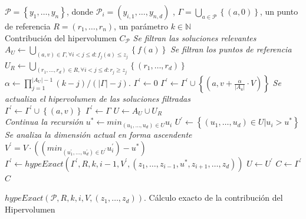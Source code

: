 \begin{algorithm}
\begin{algorithmic}[1]	
      \REQUIRE $\mathcal{P}=\left\{y_1,\ldots,y_n\right\}$, donde $\mathcal{P}_i = \left(y_{i,1},\ldots,y_{n,d}\right) $ , 
		$\varGamma = \bigcup_{a \in \mathcal{P}} \left\{ \left(a, 0 \right) \right\}$,
		un punto de referencia $R=\left(r_1,\ldots,r_n\right)$, un par\'ametro $k \in \mathds{N}$\\
      \ENSURE Contribuci\'on del hipervolumen $C_{\mathcal{P}}$
	\STATE \textit{Se filtran las soluciones relevantes} $A_U \leftarrow \bigcup_{\left(a,v\right)\in \varGamma, \forall i<j\leq d:f_{j}\left(a\right)\leq z_{j}}\left\{f\left(a\right)\right\} $ 
	\STATE \textit{Se filtran los puntos de referencia} $U_R \leftarrow \bigcup_{\left(r_1,\ldots,r_d\right)\in R, \forall i<j\leq d:r_{j}\geq z_{j}} \left\{\left(r_1,\ldots,r_d\right)\right\}$ 
		\STATE $\alpha \leftarrow \prod^{\left|A_{U}\right|-1}_{j=1} \left(k-j\right)/\left(\left|\varGamma\right| - j\right)$.			
		\STATE $\varGamma^{'} \leftarrow 0$
				\STATE $\varGamma^{'} \leftarrow \varGamma^{'} \cup \left\{\left(a,v + \frac{\alpha}{\left|A_{u}\right|}\cdot V\right)\right\}$
			\ELSE 
				\STATE \textit{Se actualiza el hipervolumen de las soluciones filtradas}\\
				$\varGamma^{'} \leftarrow \varGamma^{'} \cup \left\{\left(a,v\right)\right\}$
			\ENDIF
		\ENDFOR
	\ELSE {} 
		\STATE $\varGamma^{'} \leftarrow \varGamma$ 
		\STATE $U \leftarrow A_{U} \cup U_R$ \\
		\textit{Continua la recursi\'on}   
			\STATE $u^{*} \leftarrow min_{\left(u_1,\ldots,u_d\right)\in U} u_i$ 
			\STATE $U^{'}\leftarrow \left\{\left(u_1,\ldots,u_d\right)\in U | u_i > u^{*} \right\}$\\
			\textit{Se analiza la dimensi\'on actual en forma ascendente}
				\STATE $V^{'} = V \cdot \left( \left(min_{\left(u^{'}_1,\ldots,u^{'}_d\right)\in U^{'}} u^{'}_i\right)-u^{*}\right) $
				\STATE $\varGamma^{'} \leftarrow hypeExact \left(\varGamma^{'},R,k,i-1,V^{'},\left(z_{1},\ldots,z_{i-1},u^{*},z_{i+1},\ldots,z_{d}\right)\right)$
			\ENDIF 
			\STATE $U \leftarrow U^{'}$
		\ENDWHILE
		\ENDIF
	\ENDIF		
	\STATE $C \leftarrow \varGamma^{'} $
	\RETURN  $C$
  \end{algorithmic}
\caption[$hypeExact$]{$hypeExact \left(\mathcal{P},R,k,i,V,\left(z_{1},\ldots,z_{d}\right)\right)$. C\'alculo exacto de la contribuci\'on del Hipervolumen}
\label{alg:hvexac}
\end{algorithm}

